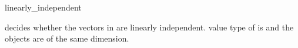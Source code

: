 \begin{ccRefFunction}{linearly_independent}
\ccHtmlNoLinks

{decides whether the vectors in \ccc{A = tuple [first,last)} are linearly
 independent.  \ccPrecond value type of  is
  and the objects are of the same dimension.}

\end{ccRefFunction}


